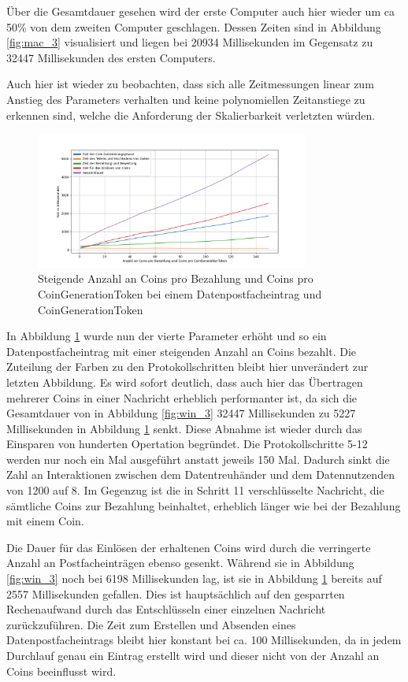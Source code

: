 \documentclass{scrreprt}
\begin{document}
Über die Gesamtdauer gesehen wird der erste Computer auch hier wieder um ca 50\% von dem zweiten Computer geschlagen. Dessen Zeiten sind in Abbildung \ref{fig:mac_3} visualisiert und liegen bei 20934 Millisekunden im Gegensatz zu 32447 Millisekunden des ersten Computers. 

Auch hier ist wieder zu beobachten, dass sich alle Zeitmessungen linear zum Anstieg des Parameters verhalten und keine polynomiellen Zeitanstiege zu erkennen sind, welche die Anforderung der Skalierbarkeit verletzten würden.


\begin{figure}[H]
    \caption{Steigende Anzahl an Coins pro Bezahlung und Coins pro CoinGenerationToken bei einem Datenpostfacheintrag und CoinGenerationToken}
    \label{fig:win_4}
    \centering
    \includegraphics[width=0.8\textwidth]{figure_win_4.png}
\end{figure}
In Abbildung \ref{fig:win_4} wurde nun der vierte Parameter erhöht und so ein Datenpostfacheintrag mit einer steigenden Anzahl an Coins bezahlt. Die Zuteilung der Farben zu den Protokollschritten bleibt hier unverändert zur letzten Abbildung. Es wird sofort deutlich, dass auch hier das Übertragen mehrerer Coins in einer Nachricht erheblich performanter ist, da sich die Gesamtdauer von in Abbildung \ref{fig:win_3} 32447 Millisekunden zu 5227 Millisekunden in Abbildung \ref{fig:win_4} senkt. Diese Abnahme ist wieder durch das Einsparen von hunderten Opertation begründet. Die Protokollschritte 5-12 werden nur noch ein Mal ausgeführt anstatt jeweils 150 Mal. Dadurch sinkt die Zahl an Interaktionen zwischen dem Datentreuhänder und dem Datennutzenden von 1200 auf 8. Im Gegenzug ist die in Schritt 11 verschlüsselte Nachricht, die sämtliche Coins zur Bezahlung beinhaltet, erheblich länger wie bei der Bezahlung mit einem Coin.

Die Dauer für das Einlösen der erhaltenen Coins wird durch die verringerte Anzahl an Postfacheinträgen ebenso gesenkt. Während sie in Abbildung \ref{fig:win_3} noch bei 6198 Millisekunden lag, ist sie in Abbildung \ref{fig:win_4} bereits auf 2557 Millisekunden gefallen. Dies ist hauptsächlich auf den gesparrten Rechenaufwand durch das Entschlüsseln einer einzelnen Nachricht zurückzuführen. Die Zeit zum Erstellen und Absenden eines Datenpostfacheintrags bleibt hier konstant bei ca. 100 Millisekunden, da in jedem Durchlauf genau ein Eintrag erstellt wird und dieser nicht von der Anzahl an Coins beeinflusst wird.
\end{document}
